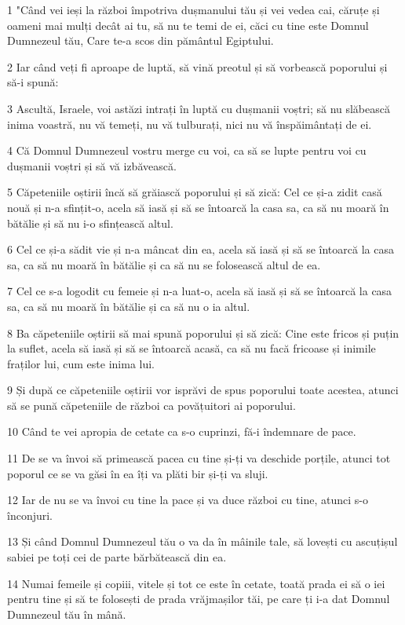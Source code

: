 \par 1 "Când vei ieși la război împotriva dușmanului tău și vei vedea cai, căruțe și oameni mai mulți decât ai tu, să nu te temi de ei, căci cu tine este Domnul Dumnezeul tău, Care te-a scos din pământul Egiptului.
\par 2 Iar când veți fi aproape de luptă, să vină preotul și să vorbească poporului și să-i spună:
\par 3 Ascultă, Israele, voi astăzi intrați în luptă cu dușmanii voștri; să nu slăbească inima voastră, nu vă temeți, nu vă tulburați, nici nu vă înspăimântați de ei.
\par 4 Că Domnul Dumnezeul vostru merge cu voi, ca să se lupte pentru voi cu dușmanii voștri și să vă izbăvească.
\par 5 Căpeteniile oștirii încă să grăiască poporului și să zică: Cel ce și-a zidit casă nouă și n-a sfințit-o, acela să iasă și să se întoarcă la casa sa, ca să nu moară în bătălie și să nu i-o sfințească altul.
\par 6 Cel ce și-a sădit vie și n-a mâncat din ea, acela să iasă și să se întoarcă la casa sa, ca să nu moară în bătălie și ca să nu se folosească altul de ea.
\par 7 Cel ce s-a logodit cu femeie și n-a luat-o, acela să iasă și să se întoarcă la casa sa, ca să nu moară în bătălie și ca să nu o ia altul.
\par 8 Ba căpeteniile oștirii să mai spună poporului și să zică: Cine este fricos și puțin la suflet, acela să iasă și să se întoarcă acasă, ca să nu facă fricoase și inimile fraților lui, cum este inima lui.
\par 9 Și după ce căpeteniile oștirii vor isprăvi de spus poporului toate acestea, atunci să se pună căpeteniile de război ca povățuitori ai poporului.
\par 10 Când te vei apropia de cetate ca s-o cuprinzi, fă-i îndemnare de pace.
\par 11 De se va învoi să primească pacea cu tine și-ți va deschide porțile, atunci tot poporul ce se va găsi în ea îți va plăti bir și-ți va sluji.
\par 12 Iar de nu se va învoi cu tine la pace și va duce război cu tine, atunci s-o înconjuri.
\par 13 Și când Domnul Dumnezeul tău o va da în mâinile tale, să lovești cu ascuțișul sabiei pe toți cei de parte bărbătească din ea.
\par 14 Numai femeile și copiii, vitele și tot ce este în cetate, toată prada ei să o iei pentru tine și să te folosești de prada vrăjmașilor tăi, pe care ți i-a dat Domnul Dumnezeul tău în mână.
